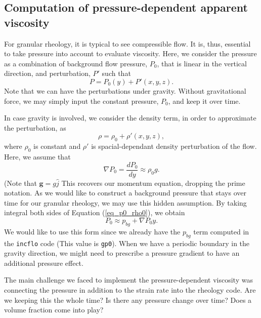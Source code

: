 \subsection{Computation of pressure-dependent apparent viscosity}
For granular rheology, it is typical to see compressible flow. It is, thus, essential to take pressure into account to evaluate viscosity.
Here, we consider the pressure as a combination of background flow pressure, $P_0$, that is linear in the vertical direction, and perturbation, $P'$ such that
\[
P = P_0(y) + P'(x,y,z).\]
Note that we can have the perturbations under gravity. Without gravitational force, we may simply input the constant pressure, $P_0$, and keep it over time.
\par
In case gravity is involved, we consider the density term, in order to approximate the perturbation, as 
\[
\rho  = \rho_0  + \rho'(x,y,z), 
\]
where $\rho_0$ is constant and $\rho'$ is spacial-dependant density perturbation of the flow. 
Here, we assume that 
\begin{equation}
    \nabla P_0  = \frac{d P_0}{d y} \approx \rho_0  g.  
\label{eq_p0_rho0}
\end{equation}
(Note that ${\bm g} = g \hat{j}$
This recovers our momentum equation, dropping the prime notation. As we would like to construct a background pressure that stays over time for our granular rheology, we may use this hidden assumption.
By taking integral both sides of Equation (\ref{eq_p0_rho0}), we obtain
\begin{equation}
    P_0 \approx p_{bg} + \nabla P_0 y.
\end{equation}
We would like to use this form since we already have the $p_{bg}$ term computed in the \verb+incflo+ code (This value is \verb+gp0+).
%
When we have a periodic boundary in the gravity direction, we might need to prescribe a pressure gradient to have an additional pressure effect. 
\par
The main challenge we faced to implement the pressure-dependent viscosity was connecting the pressure in addition to the strain rate into the rheology code.
{\color{blue} Are we keeping this the whole time? Is there any pressure change over time? Does a volume fraction come into play?}

